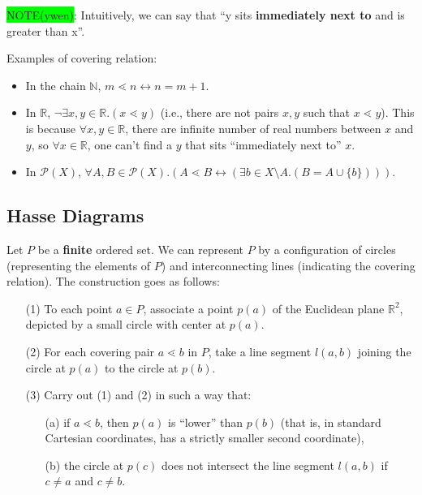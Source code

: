 \documentclass[12pt, letterpaper, oneside]{book}
\begin{document}
\colorbox{lime}{NOTE(ywen)}: Intuitively, we can say that ``y sits \textbf{immediately next to} and is greater than x''.

Examples of covering relation:
\begin{itemize}
  \item In the chain $\mathbb{N}$, $m \lessdot n \leftrightarrow n = m + 1$.
  \item In $\mathbb{R}$, $\lnot \exists x, y \in \mathbb{R}. (x \lessdot y)$ (i.e., there are not pairs $x, y$ such
        that $x \lessdot y$). This is because $\forall x, y \in \mathbb{R}$, there are infinite number of real numbers
        between $x$ and $y$, so $\forall x \in \mathbb{R}$, one can't find a $y$ that sits ``immediately next to'' $x$.
  \item In $\mathcal{P}(X)$, $\forall A, B \in \mathcal{P}(X). (A \lessdot B \leftrightarrow (\exists b \in X \setminus
          A. (B = A \cup \{b\})))$.
\end{itemize}

\subsection{Hasse Diagrams}

Let $P$ be a \textbf{finite} ordered set. We can represent $P$ by a configuration of circles (representing the elements
of $P$) and interconnecting lines (indicating the covering relation). The construction goes as follows:
\begin{enumerate}
  \item[(1)] To each point $a \in P$, associate a point $p(a)$ of the Euclidean plane $\mathbb{R}^2$, depicted by a
        small circle with center at $p(a)$.
  \item[(2)] For each covering pair $a \lessdot b$ in $P$, take a line segment $l(a,b)$ joining the circle at $p(a)$ to
        the circle at $p(b)$.
  \item[(3)] Carry out (1) and (2) in such a way that:
        \begin{enumerate}
          \item[(a)] if $a \lessdot b$, then $p(a)$ is ``lower'' than $p(b)$ (that is, in standard Cartesian coordinates,
                has a strictly smaller second coordinate),
          \item[(b)] the circle at $p(c)$ does not intersect the line segment $l(a,b)$ if $c \ne a$ and $c \ne b$.
        \end{enumerate}
\end{enumerate}
\end{document}
